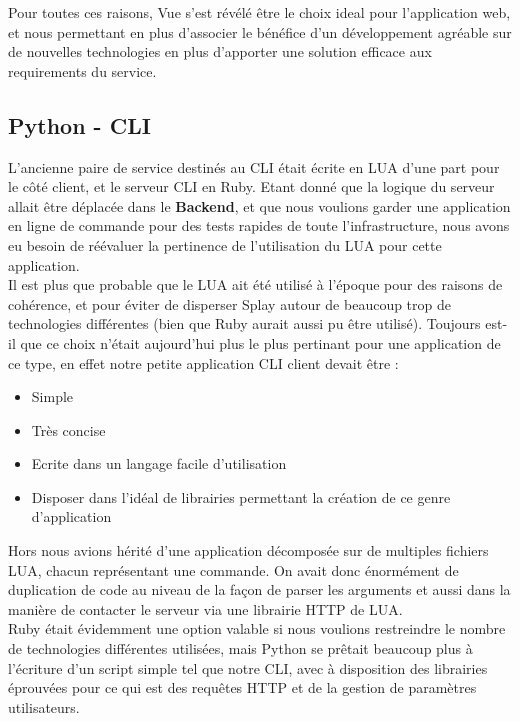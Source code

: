 \documentclass{eplmastersthesis}
\begin{document}
        Pour toutes ces raisons, Vue s'est révélé être le choix ideal pour
        l'application web, et nous permettant en plus d'associer le bénéfice
        d'un développement agréable sur de nouvelles technologies en plus
        d'apporter une solution efficace aux requirements du service.

      \subsection{Python - CLI}

        L'ancienne paire de service destinés au CLI était écrite en LUA d'une
        part pour le côté client, et le serveur CLI en Ruby. Etant donné que
        la logique du serveur allait être déplacée dans le \textbf{Backend},
        et que nous voulions garder une application en ligne de commande
        pour des tests rapides de toute l'infrastructure, nous avons eu besoin
        de réévaluer la pertinence de l'utilisation du LUA pour cette application.\\

        Il est plus que probable que le LUA ait été utilisé à l'époque pour
        des raisons de cohérence, et pour éviter de disperser Splay autour
        de beaucoup trop de technologies différentes (bien que Ruby aurait
        aussi pu être utilisé). Toujours est-il que ce choix n'était aujourd'hui
        plus le plus pertinant pour une application de ce type, en effet notre
        petite application CLI client devait être : \\

        \begin{itemize}
          \item Simple
          \item Très concise
          \item Ecrite dans un langage facile d'utilisation
          \item Disposer dans l'idéal de librairies permettant la création
          de ce genre d'application
        \end{itemize}

        Hors nous avions hérité d'une application décomposée sur de multiples
        fichiers LUA, chacun représentant une commande. On avait donc
        énormément de duplication de code au niveau de la façon de parser
        les arguments et aussi dans la manière de contacter le serveur
        via une librairie HTTP de LUA.\\
        Ruby était évidemment une option valable si nous voulions restreindre
        le nombre de technologies différentes utilisées, mais Python se prêtait
        beaucoup plus à l'écriture d'un script simple tel que notre CLI, avec
        à disposition des librairies éprouvées pour ce qui est des requêtes
        HTTP et de la gestion de paramètres utilisateurs.
\end{document}

